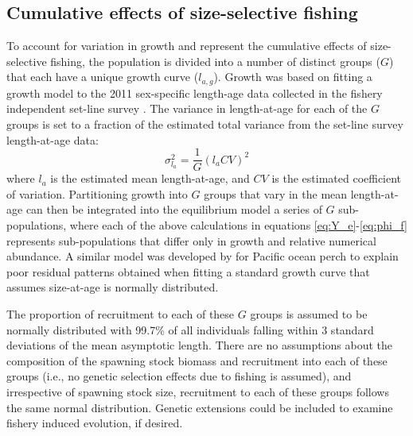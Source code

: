 \documentclass[12pt,leqno]{article}
\begin{document}
\subsection*{Cumulative effects of size-selective fishing} %
\label{sub:cumulative_effects_of_size_selective_fishing}
To account for variation in growth and represent the cumulative effects of size-selective fishing, the population is divided into a number of distinct groups ($G$) that each have a unique growth curve ($l_{a,g}$).  Growth was based on fitting a growth model to the 2011 sex-specific length-age data collected in the fishery independent set-line survey \citep{martell2013:ohr}. The variance in length-at-age for each of the $G$ groups is set to a fraction of the estimated total variance from  the set-line survey length-at-age data:
\[
 \sigma_{l_a}^2 = \frac{1}{G} (l_a CV)^2
\]
where $l_a$ is the estimated mean length-at-age, and $CV$ is the estimated coefficient of variation.  Partitioning growth  into $G$  groups that vary in the mean length-at-age can then be integrated into the equilibrium model a series of $G$ sub-populations, where each of the above calculations in equations \eqref{eq:Y_e}-\eqref{eq:phi_f} represents sub-populations that differ only in growth and relative numerical abundance. A similar model was developed by \cite{mulligan1992length} for Pacific ocean perch to explain poor residual patterns obtained when fitting a standard growth curve that assumes size-at-age is normally distributed.

The proportion of recruitment to each of these $G$ groups is assumed to be normally distributed with 99.7\% of all individuals falling within 3 standard deviations of the mean asymptotic length.  There are no assumptions about the composition of the spawning stock biomass and recruitment into each of these groups (i.e., no genetic selection effects due to fishing is assumed), and irrespective of spawning stock size, recruitment to each of these groups follows the same normal distribution.  Genetic extensions could be included to examine fishery induced evolution, if desired.
\end{document}
